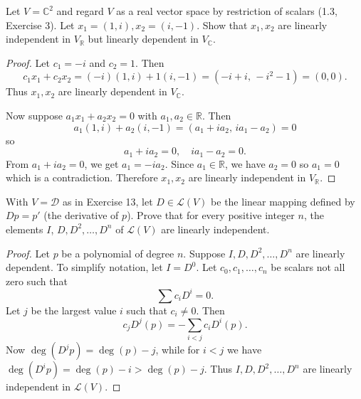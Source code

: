 \begin{tcolorbox}[title=Problem 12, breakable]
    Let $V = \mathbb{C}^2$ and regard $V$ as a real vector space by restriction
    of scalars (1.3, Exercise 3). Let $x_1 = (1, i), x_2 = (i, -1)$.
    Show that $x_1, x_2$ are linearly independent in $V_{\mathbb{R}}$ but 
    linearly dependent in $V_{\mathbb{C}}$.
\end{tcolorbox}

\begin{proof}
    Let $c_1 = -i$ and $c_2 = 1$. Then
    \[
        c_1 x_1 + c_2 x_2 = (-i)(1,i) + 1(i,-1)
        = (-i + i,\,-i^2 - 1)
        = (0,0).
    \]
    Thus $x_1, x_2$ are linearly dependent in $V_{\mathbb{C}}$.

    Now suppose $a_1 x_1 + a_2 x_2 = 0$ with $a_1, a_2 \in \mathbb{R}$.
    Then
    \[
        a_1 (1, i) + a_2 (i, -1) = (a_1 + i a_2,\, i a_1 - a_2) = 0
    \]
    so
    \[
        a_1 + i a_2 = 0, \quad i a_1 - a_2 = 0.
    \]
    From $a_1 + i a_2 = 0$, we get $a_1 = -i a_2$. Since $a_1 \in \mathbb{R}$,
    we have $a_2 = 0$ so $a_1 = 0$ which is a contradiction.
    Therefore $x_1, x_2$ are linearly independent in $V_{\mathbb{R}}$.
\end{proof}

\begin{tcolorbox}[title=Problem 14, breakable]
    With $V = \mathcal{D}$ as in Exercise 13, let $D \in \mathcal{L}(V)$
    be the linear mapping defined by $Dp = p'$ (the derivative of $p$).
    Prove that for every positive integer $n$, the elements $I$,
    $D, D^2, \ldots, D^n$ of $\mathcal{L}(V)$ are linearly independent.
\end{tcolorbox}

\begin{proof}
    Let $p$ be a polynomial of degree $n$.
    Suppose $I, D, D^2, \ldots, D^n$ are linearly dependent.
    To simplify notation, let $I = D^0$.
    Let $c_0, c_1, \ldots, c_n$ be scalars not all zero such that 
    \[\sum c_i D^i = 0.\]
    Let $j$ be the largest value $i$ such that $c_i \ne 0$.
    Then
    \[c_j D^j(p) = -\sum_{i < j} c_i D^i(p).\]
    Now $\deg(D^j p) = \deg(p) - j$, while for $i<j$ we have
    $\deg(D^i p) = \deg(p) - i > \deg(p) - j$.
    Thus $I, D, D^2, \ldots, D^n$ are linearly independent in $\mathcal{L}(V)$.
\end{proof}


